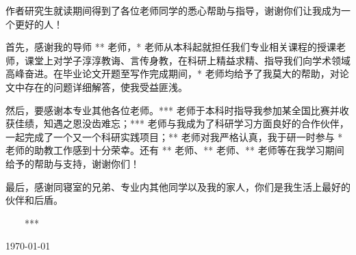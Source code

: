 \begin{thanks}

作者研究生就读期间得到了各位老师同学的悉心帮助与指导，谢谢你们让我成为一个更好的人！

首先，感谢我的导师 ** 老师，* 老师从本科起就担任我们专业相关课程的授课老师，课堂上对学子淳淳教诲、言传身教，在科研上精益求精、指导我们向学术领域高峰奋进。在毕业论文开题至写作完成期间，* 老师均给予了我莫大的帮助，对论文中存在的问题详细解答，使我受益匪浅。

然后，要感谢本专业其他各位老师。*** 老师于本科时指导我参加某全国比赛并收获佳绩，知遇之恩没齿难忘；*** 老师与我成为了科研学习方面良好的合作伙伴，一起完成了一个又一个科研实践项目；** 老师对我严格认真，我于研一时参与 * 老师的助教工作感到十分荣幸。还有 ** 老师、** 老师、** 老师等在我学习期间给予的帮助与支持，谢谢你们！

最后，感谢同寝室的兄弟、专业内其他同学以及我的家人，你们是我生活上最好的伙伴和后盾。

\vskip 18pt

\begin{flushright}

~~~~***~~~~

\today

\end{flushright}

\end{thanks}
